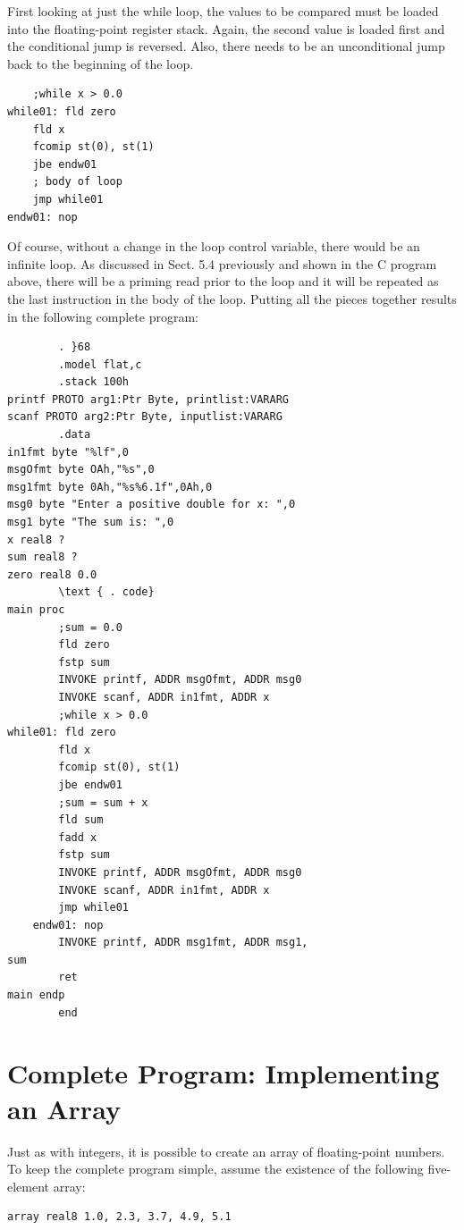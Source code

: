 \documentclass[10pt]{book}
\begin{document}
First looking at just the while loop, the values to be compared must be loaded into the floating-point register stack. Again, the second value is loaded first and the conditional jump is reversed. Also, there needs to be an unconditional jump back to the beginning of the loop.

\begin{verbatim}
    ;while x > 0.0
while01: fld zero
    fld x
    fcomip st(0), st(1)
    jbe endw01
    ; body of loop
    jmp while01
endw01: nop
\end{verbatim}

Of course, without a change in the loop control variable, there would be an infinite loop. As discussed in Sect. 5.4 previously and shown in the C program above, there will be a priming read prior to the loop and it will be repeated as the last instruction in the body of the loop. Putting all the pieces together results in the following complete program:

\begin{verbatim}
        . }68
        .model flat,c
        .stack 100h
printf PROTO arg1:Ptr Byte, printlist:VARARG
scanf PROTO arg2:Ptr Byte, inputlist:VARARG
        .data
in1fmt byte "%lf",0
msgOfmt byte OAh,"%s",0
msg1fmt byte 0Ah,"%s%6.1f",0Ah,0
msg0 byte "Enter a positive double for x: ",0
msg1 byte "The sum is: ",0
x real8 ?
sum real8 ?
zero real8 0.0
        \text { . code}
main proc
        ;sum = 0.0
        fld zero
        fstp sum
        INVOKE printf, ADDR msgOfmt, ADDR msg0
        INVOKE scanf, ADDR in1fmt, ADDR x
        ;while x > 0.0
while01: fld zero
        fld x
        fcomip st(0), st(1)
        jbe endw01
        ;sum = sum + x
        fld sum
        fadd x
        fstp sum
        INVOKE printf, ADDR msgOfmt, ADDR msg0
        INVOKE scanf, ADDR in1fmt, ADDR x
        jmp while01
    endw01: nop
        INVOKE printf, ADDR msg1fmt, ADDR msg1,
sum
        ret
main endp
        end
\end{verbatim}

\section{Complete Program: Implementing an Array}
Just as with integers, it is possible to create an array of floating-point numbers. To keep the complete program simple, assume the existence of the following five-element array:


\begin{verbatim}
array real8 1.0, 2.3, 3.7, 4.9, 5.1
\end{verbatim}
\end{document}
